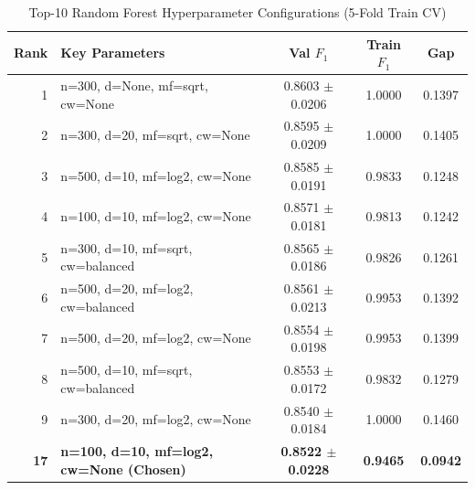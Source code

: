 \begin{table}[!htbp]
\centering
\caption{Top-10 Random Forest Hyperparameter Configurations (5-Fold Train CV)}
\label{tab:rf_tuning}
\footnotesize
\begin{tabularx}{\linewidth}{r X c c c}
\toprule
\textbf{Rank} & \textbf{Key Parameters} & \textbf{Val $F_1$} & \textbf{Train $F_1$} & \textbf{Gap} \\
\midrule
1 & n=300, d=None, mf=sqrt, cw=None & 0.8603 $\pm$ 0.0206 & 1.0000 & 0.1397 \\
2 & n=300, d=20, mf=sqrt, cw=None & 0.8595 $\pm$ 0.0209 & 1.0000 & 0.1405 \\
3 & n=500, d=10, mf=log2, cw=None & 0.8585 $\pm$ 0.0191 & 0.9833 & 0.1248 \\
4 & n=100, d=10, mf=log2, cw=None & 0.8571 $\pm$ 0.0181 & 0.9813 & 0.1242 \\
5 & n=300, d=10, mf=sqrt, cw=balanced & 0.8565 $\pm$ 0.0186 & 0.9826 & 0.1261 \\
6 & n=500, d=20, mf=log2, cw=balanced & 0.8561 $\pm$ 0.0213 & 0.9953 & 0.1392 \\
7 & n=500, d=20, mf=log2, cw=None & 0.8554 $\pm$ 0.0198 & 0.9953 & 0.1399 \\
8 & n=500, d=10, mf=sqrt, cw=balanced & 0.8553 $\pm$ 0.0172 & 0.9832 & 0.1279 \\
9 & n=300, d=20, mf=log2, cw=None & 0.8540 $\pm$ 0.0184 & 1.0000 & 0.1460 \\
\textbf{17} & \textbf{n=100, d=10, mf=log2, cw=None (Chosen)} & \textbf{0.8522 $\pm$ 0.0228} & \textbf{0.9465} & \textbf{0.0942} \\
\bottomrule
\end{tabularx}
\end{table}